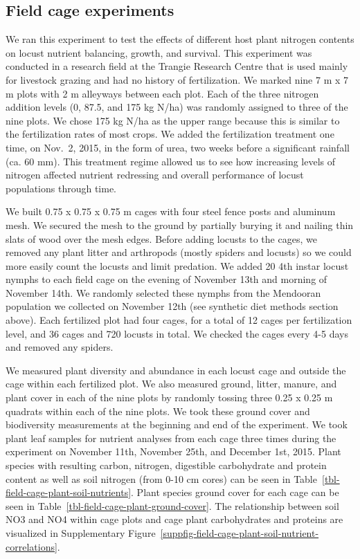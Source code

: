 \documentclass[
]{article}
\begin{document}
\subsection{Field cage experiments}\label{field-cage-experiments}

We ran this experiment to test the effects of different host plant
nitrogen contents on locust nutrient balancing, growth, and survival.
This experiment was conducted in a research field at the Trangie
Research Centre that is used mainly for livestock grazing and had no
history of fertilization. We marked nine 7 m x 7 m plots with 2 m
alleyways between each plot. Each of the three nitrogen addition levels
(0, 87.5, and 175 kg N/ha) was randomly assigned to three of the nine
plots. We chose 175 kg N/ha as the upper range because this is similar
to the fertilization rates of most crops. We added the fertilization
treatment one time, on Nov.~2, 2015, in the form of urea, two weeks
before a significant rainfall (ca. 60 mm). This treatment regime allowed
us to see how increasing levels of nitrogen affected nutrient redressing
and overall performance of locust populations through time.

We built 0.75 x 0.75 x 0.75 m cages with four steel fence posts and
aluminum mesh. We secured the mesh to the ground by partially burying it
and nailing thin slats of wood over the mesh edges. Before adding
locusts to the cages, we removed any plant litter and arthropods (mostly
spiders and locusts) so we could more easily count the locusts and limit
predation. We added 20 4th instar locust nymphs to each field cage on
the evening of November 13th and morning of November 14th. We randomly
selected these nymphs from the Mendooran population we collected on
November 12th (see synthetic diet methods section above). Each
fertilized plot had four cages, for a total of 12 cages per
fertilization level, and 36 cages and 720 locusts in total. We checked
the cages every 4-5 days and removed any spiders.

We measured plant diversity and abundance in each locust cage and
outside the cage within each fertilized plot. We also measured ground,
litter, manure, and plant cover in each of the nine plots by randomly
tossing three 0.25 x 0.25 m quadrats within each of the nine plots. We
took these ground cover and biodiversity measurements at the beginning
and end of the experiment. We took plant leaf samples for nutrient
analyses from each cage three times during the experiment on November
11th, November 25th, and December 1st, 2015. Plant species with
resulting carbon, nitrogen, digestible carbohydrate and protein content
as well as soil nitrogen (from 0-10 cm cores) can be seen in
Table~\ref{tbl-field-cage-plant-soil-nutrients}. Plant species ground
cover for each cage can be seen in
Table~\ref{tbl-field-cage-plant-ground-cover}. The relationship between
soil NO3 and NO4 within cage plots and cage plant carbohydrates and
proteins are visualized in
Supplementary Figure~\ref{suppfig-field-cage-plant-soil-nutrient-correlations}.
\end{document}
